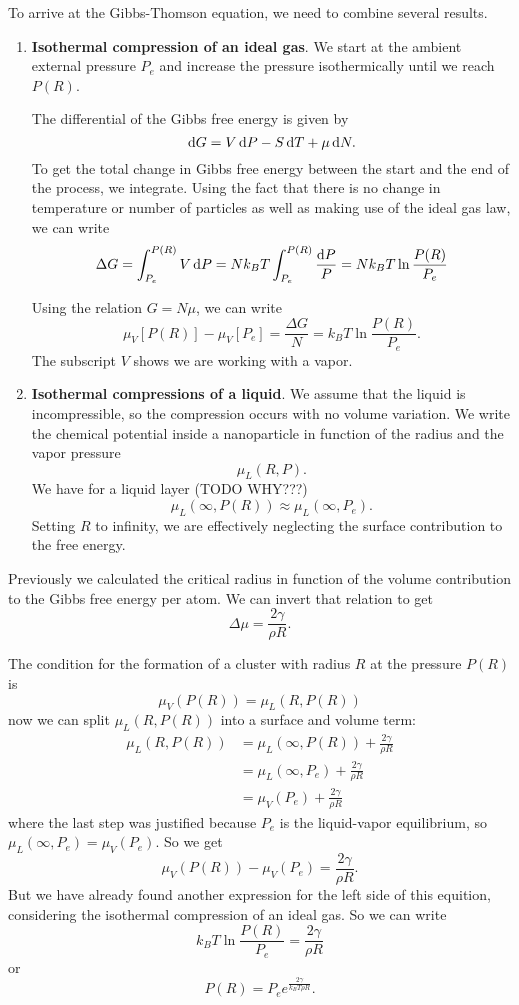 To arrive at the Gibbs-Thomson equation, we need to combine several results.
\begin{enumerate}
\item \textbf{Isothermal compression of an ideal gas}. We start at the ambient external pressure $P_e$ and increase the pressure isothermically until we reach $P(R)$.

The differential of the Gibbs free energy is given by
\[ \operatorname{d \!}{G} = V \operatorname{d \!}{P} - S \operatorname{d \!}{T} +\mu \operatorname{d \!}{N}. \]
To get the total change in Gibbs free energy between the start and the end of the process, we integrate. Using the fact that there is no change in temperature or number of particles as well as making use of the ideal gas law, we can write
\[ \Delta G = \int_{P_e}^{P(R)}V \operatorname{d \!}{P} = N k_B T\int_{P_e}^{P(R)} \frac{\operatorname{d \!}{P}}{P} = N k_B T \ln \frac{P(R)}{P_e}\]

Using the relation $G = N\mu$, we can write
\[ \mu_V[P(R)] - \mu_V[P_e] = \frac{\Delta G}{N} = k_B T \ln \frac{P(R)}{P_e}. \]
The subscript $V$ shows we are working with a vapor.
\item \textbf{Isothermal compressions of a liquid}. We assume that the liquid is incompressible, so the compression occurs with no volume variation. We write the chemical potential inside a nanoparticle in function of the radius and the vapor pressure
\[ \mu_L(R, P). \]
We have for a liquid layer (TODO WHY???)
\[ \mu_L(\infty, P(R)) \approx \mu_L(\infty, P_e). \]
Setting $R$ to infinity, we are effectively neglecting the surface contribution to the free energy.
\end{enumerate}

Previously we calculated the critical radius in function of the volume contribution to the Gibbs free energy per atom. We can invert that relation to get 
\[ \Delta \mu = \frac{2\gamma}{\rho R}. \]

The condition for the formation of a cluster with radius $R$ at the pressure $P(R)$ is
\[ \mu_V(P(R)) = \mu_L(R,P(R)) \]
now we can split $\mu_L(R,P(R))$ into a surface and volume term:
\begin{align*}
\mu_L(R,P(R)) &= \mu_L(\infty,P(R)) + \frac{2\gamma}{\rho R} \\
&= \mu_L(\infty,P_e) + \frac{2\gamma}{\rho R} \\
&= \mu_V(P_e) + \frac{2\gamma}{\rho R}
\end{align*}
where the last step was justified because $P_e$ is the liquid-vapor equilibrium, so $\mu_L(\infty,P_e) = \mu_V(P_e)$. So we get
\[ \mu_V(P(R)) - \mu_V(P_e) = \frac{2\gamma}{\rho R}. \]
But we have already found another expression for the left side of this equition, considering the isothermal compression of an ideal gas. So we can write
\[ k_B T \ln \frac{P(R)}{P_e} = \frac{2\gamma}{\rho R} \]
or
\[ P(R) = P_e e^{\frac{2\gamma}{k_B T \rho R}}. \] 

